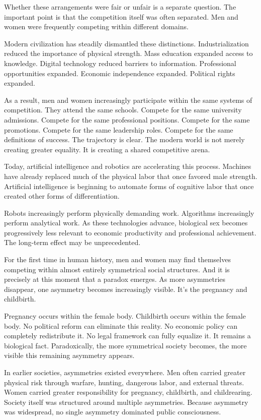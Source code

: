 \documentclass[12pt]{article}
\begin{document}
Whether these arrangements were fair or unfair is a separate question. The important point is that the competition itself was often separated. Men and women were frequently competing within different domains.

Modern civilization has steadily dismantled these distinctions. Industrialization reduced the importance of physical strength. Mass education expanded access to knowledge. Digital technology reduced barriers to information. Professional opportunities expanded. Economic independence expanded. Political rights expanded.

As a result, men and women increasingly participate within the same systems of competition. They attend the same schools. Compete for the same university admissions. Compete for the same professional positions. Compete for the same promotions. Compete for the same leadership roles. Compete for the same definitions of success. The trajectory is clear. The modern world is not merely creating greater equality. It is creating a shared competitive arena. 

Today, artificial intelligence and robotics are accelerating this process. Machines have already replaced much of the physical labor that once favored male strength. Artificial intelligence is beginning to automate forms of cognitive labor that once created other forms of differentiation.

Robots increasingly perform physically demanding work. Algorithms increasingly perform analytical work. As these technologies advance, biological sex becomes progressively less relevant to economic productivity and professional achievement. The long-term effect may be unprecedented. 

For the first time in human history, men and women may find themselves competing within almost entirely symmetrical social structures. And it is precisely at this moment that a paradox emerges. As more asymmetries disappear, one asymmetry becomes increasingly visible. It's the pregnancy and childbirth. 

Pregnancy occurs within the female body. Childbirth occurs within the female body. No political reform can eliminate this reality. No economic policy can completely redistribute it. No legal framework can fully equalize it. It remains a biological fact. Paradoxically, the more symmetrical society becomes, the more visible this remaining asymmetry appears. 

In earlier societies, asymmetries existed everywhere. Men often carried greater physical risk through warfare, hunting, dangerous labor, and external threats. Women carried greater responsibility for pregnancy, childbirth, and childrearing. Society itself was structured around multiple asymmetries. Because asymmetry was widespread, no single asymmetry dominated public consciousness. 
\end{document}
